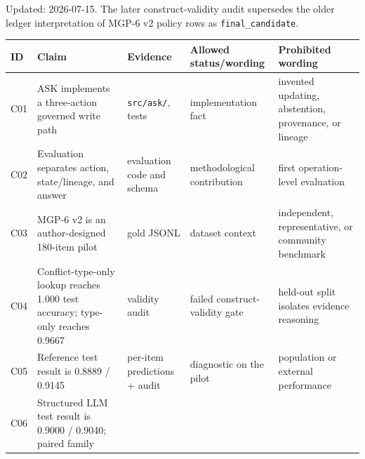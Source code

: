 Updated: 2026-07-15. The later construct-validity audit supersedes the
older ledger interpretation of MGP-6 v2 policy rows as
\texttt{final\_candidate}.

{\def\LTcaptype{none} %
\begin{longtable}[]{@{}
  >{\raggedright\arraybackslash}p{}
  >{\raggedright\arraybackslash}p{}
  >{\raggedright\arraybackslash}p{}
  >{\raggedright\arraybackslash}p{}
  >{\raggedright\arraybackslash}p{}@{}}
\toprule\noalign{}
\begin{minipage}[b]{\linewidth}\raggedright
ID
\end{minipage} & \begin{minipage}[b]{\linewidth}\raggedright
Claim
\end{minipage} & \begin{minipage}[b]{\linewidth}\raggedright
Evidence
\end{minipage} & \begin{minipage}[b]{\linewidth}\raggedright
Allowed status/wording
\end{minipage} & \begin{minipage}[b]{\linewidth}\raggedright
Prohibited wording
\end{minipage} \\
\midrule\noalign{}
\endhead
\bottomrule\noalign{}
\endlastfoot
C01 & ASK implements a three-action governed write path &
\texttt{src/ask/}, tests & implementation fact & invented updating,
abstention, provenance, or lineage \\
C02 & Evaluation separates action, state/lineage, and answer &
evaluation code and schema & methodological contribution & first
operation-level evaluation \\
C03 & MGP-6 v2 is an author-designed 180-item pilot & gold JSONL &
dataset context & independent, representative, or community benchmark \\
C04 & Conflict-type-only lookup reaches 1.000 test accuracy; type-only
reaches 0.9667 & validity audit & failed construct-validity gate &
held-out split isolates evidence reasoning \\
C05 & Reference test result is 0.8889 / 0.9145 & per-item predictions +
audit & diagnostic on the pilot & population or external performance \\
C06 & Structured LLM test result is 0.9000 / 0.9040; paired family

\end{longtable}}
